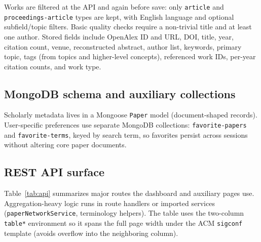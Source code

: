 \documentclass[sigconf]{acmart}
\begin{document}
Works are filtered at the API and again before save: only \texttt{article} and \texttt{proceedings-article} types are kept, with English language and optional subfield/topic filters. Basic quality checks require a non-trivial title and at least one author. Stored fields include OpenAlex ID and URL, DOI, title, year, citation count, venue, reconstructed abstract, author list, keywords, primary topic, tags (from topics and higher-level concepts), referenced work IDs, per-year citation counts, and work type.

\subsection{MongoDB schema and auxiliary collections}
Scholarly metadata lives in a Mongoose \texttt{Paper} model (document-shaped records). User-specific preferences use separate MongoDB collections: \texttt{favorite-papers} and \texttt{favorite-terms}, keyed by search term, so favorites persist across sessions without altering core paper documents.

\subsection{REST API surface}
Table~\ref{tab:api} summarizes major routes the dashboard and auxiliary pages use. Aggregation-heavy logic runs in route handlers or imported services (\texttt{paperNetworkService}, terminology helpers). The table uses the two-column \texttt{table*} environment so it spans the full page width under the ACM \texttt{sigconf} template (avoids overflow into the neighboring column).
\end{document}
